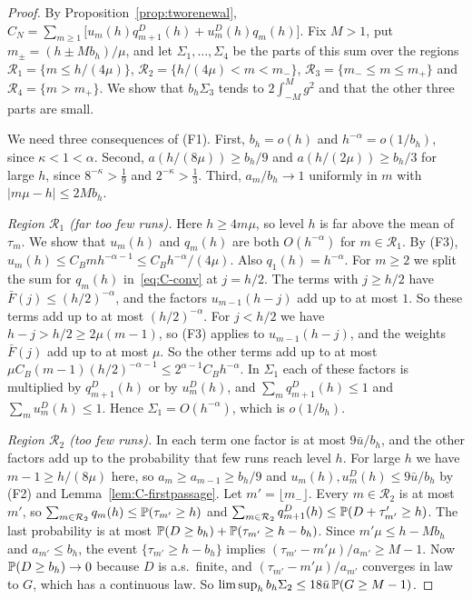 \begin{proof}
By Proposition~\ref{prop:tworenewal},
$C_N=\sum_{m\ge1}\bigl[u_m(h)q^D_{m+1}(h)+u^D_m(h)q_m(h)\bigr]$. Fix $M>1$, put
$m_\pm=(h\pm Mb_h)/\mu$, and let $\Sigma_1,\dots,\Sigma_4$ be the parts of this sum over
the regions $\mathcal R_1=\{m\le h/(4\mu)\}$, $\mathcal R_2=\{h/(4\mu)<m<m_-\}$,
$\mathcal R_3=\{m_-\le m\le m_+\}$ and $\mathcal R_4=\{m>m_+\}$. We show that
$b_h\Sigma_3$ tends to $2\int_{-M}^Mg^2$ and that the other three parts are small.

We need three consequences of (F1). First, $b_h=o(h)$ and $h^{-\alpha}=o(1/b_h)$, since
$\kappa<1<\alpha$. Second, $a(h/(8\mu))\ge b_h/9$ and $a(h/(2\mu))\ge b_h/3$ for large
$h$, since $8^{-\kappa}>\frac19$ and $2^{-\kappa}>\frac13$. Third, $a_m/b_h\to1$
uniformly in $m$ with $\lvert m\mu-h\rvert\le2Mb_h$.

\emph{Region $\mathcal R_1$ (far too few runs).} Here $h\ge4m\mu$, so level $h$ is far above
the mean of $\tau_m$. We show that $u_m(h)$ and $q_m(h)$ are both $O(h^{-\alpha})$ for
$m\in\mathcal R_1$. By (F3), $u_m(h)\le C_Bmh^{-\alpha-1}\le C_Bh^{-\alpha}/(4\mu)$. Also
$q_1(h)=h^{-\alpha}$. For $m\ge2$ we split the sum for $q_m(h)$ in~\eqref{eq:C-conv} at
$j=h/2$. The terms with $j\ge h/2$ have $\bar F(j)\le(h/2)^{-\alpha}$, and the factors
$u_{m-1}(h-j)$ add up to at most $1$. So these terms add up to at most
$(h/2)^{-\alpha}$. For $j<h/2$ we have $h-j>h/2\ge2\mu(m-1)$, so (F3) applies to
$u_{m-1}(h-j)$, and the weights $\bar F(j)$ add up to at most $\mu$. So the other terms
add up to at most $\mu C_B(m-1)(h/2)^{-\alpha-1}\le2^{\alpha-1}C_Bh^{-\alpha}$. In
$\Sigma_1$ each of these factors is multiplied by $q^D_{m+1}(h)$ or by $u^D_m(h)$, and
$\sum_mq^D_{m+1}(h)\le1$ and $\sum_mu^D_m(h)\le1$. Hence $\Sigma_1=O(h^{-\alpha})$, which
is $o(1/b_h)$.

\emph{Region $\mathcal R_2$ (too few runs).} In each term one
factor is at most $9\bar u/b_h$, and the other factors add up to the probability that few
runs reach level $h$. For large $h$ we have $m-1\ge h/(8\mu)$ here, so
$a_m\ge a_{m-1}\ge b_h/9$ and $u_m(h),u^D_m(h)\le9\bar u/b_h$ by (F2) and
Lemma~\ref{lem:C-firstpassage}. Let $m'=\lfloor m_-\rfloor$. Every $m\in\mathcal R_2$ is
at most $m'$, so $\sum_{m\in\mathcal R_2}q_m(h)\le\mathbb{P}(\tau_{m'}\ge h)$ and
$\sum_{m\in\mathcal R_2}q^D_{m+1}(h)\le\mathbb{P}(D+\tau'_{m'}\ge h)$. The last probability
is at most $\mathbb{P}(D\ge b_h)+\mathbb{P}(\tau_{m'}\ge h-b_h)$. Since $m'\mu\le h-Mb_h$ and
$a_{m'}\le b_h$, the event $\{\tau_{m'}\ge h-b_h\}$ implies
$(\tau_{m'}-m'\mu)/a_{m'}\ge M-1$. Now $\mathbb{P}(D\ge b_h)\to0$ because $D$ is a.s.\
finite, and $(\tau_{m'}-m'\mu)/a_{m'}$ converges in law to $G$, which has a continuous
law. So $\limsup_hb_h\Sigma_2\le18\bar u\,\mathbb{P}(G\ge M-1)$.


\end{proof}
